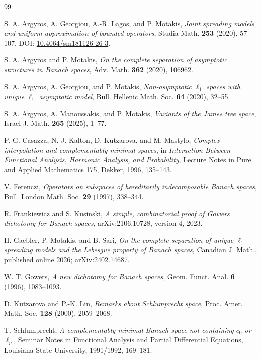 \documentclass[11pt]{article}
\theoremstyle{definition}
\theoremstyle{remark}
\begin{document}
\begin{thebibliography}{99}

S. A. Argyros, A. Georgiou, A.-R. Lagos, and P. Motakis,
\emph{Joint spreading models and uniform approximation of bounded operators},
Studia Math. \textbf{253} (2020), 57--107.
DOI: \href{https://doi.org/10.4064/sm181126-26-3}{10.4064/sm181126-26-3}.

S. A. Argyros and P. Motakis,
\emph{On the complete separation of asymptotic structures in Banach spaces},
Adv. Math. \textbf{362} (2020), 106962.

S. A. Argyros, A. Georgiou, and P. Motakis,
\emph{Non-asymptotic $\ell_1$ spaces with unique $\ell_1$ asymptotic model},
Bull. Hellenic Math. Soc. \textbf{64} (2020), 32--55.

S. A. Argyros, A. Manoussakis, and P. Motakis,
\emph{Variants of the James tree space},
Israel J. Math. \textbf{265} (2025), 1--77.

P. G. Casazza, N. J. Kalton, D. Kutzarova, and M. Mastylo,
\emph{Complex interpolation and complementably minimal spaces},
in \emph{Interaction Between Functional Analysis, Harmonic Analysis, and Probability},
Lecture Notes in Pure and Applied Mathematics 175, Dekker, 1996, 135--143.

V. Ferenczi,
\emph{Operators on subspaces of hereditarily indecomposable Banach spaces},
Bull. London Math. Soc. \textbf{29} (1997), 338--344.

R. Frankiewicz and S. Kusinski,
\emph{A simple, combinatorial proof of Gowers dichotomy for Banach spaces},
arXiv:2106.10728, version 4, 2023.

H. Gaebler, P. Motakis, and B. Sari,
\emph{On the complete separation of unique $\ell_1$ spreading models and the Lebesgue property of Banach spaces},
Canadian J. Math., published online 2026; arXiv:2402.14687.

W. T. Gowers,
\emph{A new dichotomy for Banach spaces},
Geom. Funct. Anal. \textbf{6} (1996), 1083--1093.

D. Kutzarova and P.-K. Lin,
\emph{Remarks about Schlumprecht space},
Proc. Amer. Math. Soc. \textbf{128} (2000), 2059--2068.

T. Schlumprecht,
\emph{A complementably minimal Banach space not containing $c_0$ or $\ell_p$},
Seminar Notes in Functional Analysis and Partial Differential Equations,
Louisiana State University, 1991/1992, 169--181.

\end{thebibliography}
\end{document}
